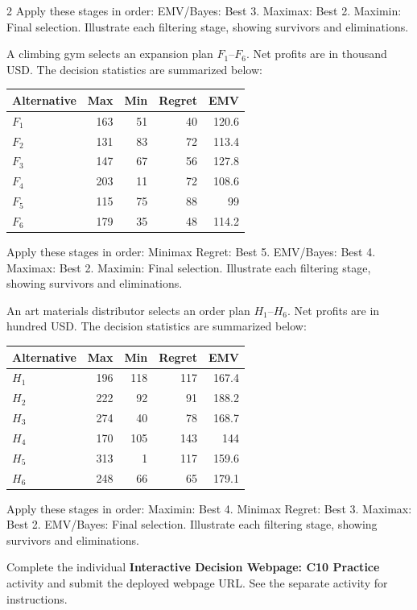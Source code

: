 \begin{multicols}{2}
\noindent Apply these stages in order: EMV/Bayes: Best 3. Maximax: Best 2. Maximin: Final selection.
Illustrate each filtering stage, showing survivors and eliminations.

A climbing gym selects an expansion plan $F_1$--$F_6$. Net profits are in thousand USD. The decision statistics are summarized below:
\vspace{-4mm}
\begin{center}\small\setlength{\tabcolsep}{4pt}
	\begin{tabular}{lrrrr}\toprule
		Alternative & Max & Min & Regret & EMV\\ \midrule
		$F_1$ & 163 & 51 & 40 & 120.6\\
		$F_2$ & 131 & 83 & 72 & 113.4\\
		$F_3$ & 147 & 67 & 56 & 127.8\\
		$F_4$ & 203 & 11 & 72 & 108.6\\
		$F_5$ & 115 & 75 & 88 & 99\\
		$F_6$ & 179 & 35 & 48 & 114.2\\
		\bottomrule
	\end{tabular}
\end{center}
\vspace{-3mm}
\noindent Apply these stages in order: Minimax Regret: Best 5. EMV/Bayes: Best 4. Maximax: Best 2. Maximin: Final selection.
Illustrate each filtering stage, showing survivors and eliminations.

An art materials distributor selects an order plan $H_1$--$H_6$. Net profits are in hundred USD. The decision statistics are summarized below:
\vspace{-3mm}
\begin{center}\small\setlength{\tabcolsep}{4pt}
	\begin{tabular}{lrrrr}\toprule
		Alternative & Max & Min & Regret & EMV\\ \midrule
		$H_1$ & 196 & 118 & 117 & 167.4\\
		$H_2$ & 222 & 92 & 91 & 188.2\\
		$H_3$ & 274 & 40 & 78 & 168.7\\
		$H_4$ & 170 & 105 & 143 & 144\\
		$H_5$ & 313 & 1 & 117 & 159.6\\
		$H_6$ & 248 & 66 & 65 & 179.1\\
		\bottomrule
	\end{tabular}
\end{center}
\vspace{-3mm}
\noindent Apply these stages in order: Maximin: Best 4. Minimax Regret: Best 3. Maximax: Best 2. EMV/Bayes: Final selection.
Illustrate each filtering stage, showing survivors and eliminations.

\par
{}
		Complete the individual \textbf{Interactive Decision Webpage: C10 Practice} activity and submit the deployed webpage URL. See the separate activity for instructions.
		
	\end{multicols}

